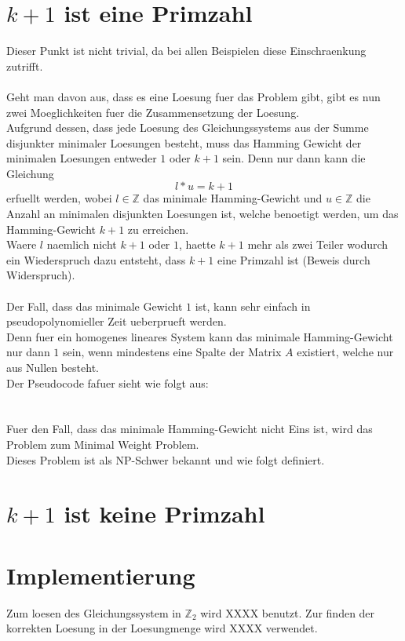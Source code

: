 \documentclass[a4paper,10pt,ngerman]{scrartcl}
\begin{document}
\section{$k+1$ ist eine Primzahl}
Dieser Punkt ist nicht trivial, da bei allen Beispielen diese Einschraenkung zutrifft.
\\\\
Geht man davon aus, dass es eine Loesung fuer das Problem gibt, gibt es nun zwei Moeglichkeiten fuer die Zusammensetzung der Loesung.\\
Aufgrund dessen, dass jede Loesung des Gleichungssystems aus der Summe disjunkter minimaler Loesungen besteht, muss das Hamming Gewicht der minimalen Loesungen 		entweder $1$ oder $k+1$ sein. Denn nur dann kann die Gleichung 
$$
l*u = k+1
$$
erfuellt werden, wobei $l \in \mathbb{Z}$ das minimale Hamming-Gewicht und $u \in \mathbb{Z}$ die Anzahl an minimalen disjunkten Loesungen ist, welche benoetigt werden, um das Hamming-Gewicht $k+1$ zu erreichen.\\
Waere $l$ naemlich nicht $k+1$ oder $1$, haette $k+1$ mehr als zwei Teiler wodurch ein Wiederspruch dazu entsteht, dass $k+1$ eine Primzahl ist (Beweis durch Widerspruch).
\\\\
Der Fall, dass das minimale Gewicht $1$ ist, kann sehr einfach in pseudopolynomieller Zeit ueberprueft werden.\\
Denn fuer ein homogenes lineares System kann das minimale Hamming-Gewicht nur dann $1$ sein, wenn mindestens eine Spalte der Matrix $A$ existiert, welche nur aus Nullen besteht.\\
Der Pseudocode fafuer sieht wie folgt aus:\\

\\\\
Fuer den Fall, dass das minimale Hamming-Gewicht nicht Eins ist, wird das Problem zum Minimal Weight Problem.\\
Dieses Problem ist als NP-Schwer bekannt und wie folgt definiert.\\

	
\section{$k+1$ ist keine Primzahl}

\section{Implementierung}
Zum loesen des Gleichungssystem in \(\mathbb{Z}_{2}\) wird XXXX benutzt.
Zur finden der korrekten Loesung in der Loesungmenge wird XXXX verwendet.
\end{document}
